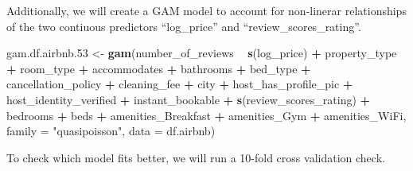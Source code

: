 \documentclass[
]{article}
\newenvironment{Shaded}{\begin{snugshade}}{\end{snugshade}}
\newcommand{\DataTypeTok}[1]{\textcolor[rgb]{0.13,0.29,0.53}{#1}}
\newcommand{\FloatTok}[1]{\textcolor[rgb]{0.00,0.00,0.81}{#1}}
\newcommand{\KeywordTok}[1]{\textcolor[rgb]{0.13,0.29,0.53}{\textbf{#1}}}
\newcommand{\NormalTok}[1]{#1}
\newcommand{\OperatorTok}[1]{\textcolor[rgb]{0.81,0.36,0.00}{\textbf{#1}}}
\newcommand{\StringTok}[1]{\textcolor[rgb]{0.31,0.60,0.02}{#1}}
\begin{document}
Additionally, we will create a GAM model to account for non-linerar
relationships of the two contiuous predictors ``log\_price'' and
``review\_scores\_rating''.

\begin{Shaded}
\begin{Highlighting}[]
\NormalTok{gam.df.airbnb}\FloatTok{.53}\NormalTok{ <-}\StringTok{ }\KeywordTok{gam}\NormalTok{(number_of_reviews }\OperatorTok{~}\StringTok{ }\KeywordTok{s}\NormalTok{(log_price) }\OperatorTok{+}\StringTok{ }\NormalTok{property_type }\OperatorTok{+}\StringTok{ }\NormalTok{room_type }\OperatorTok{+}
\StringTok{                          }\NormalTok{accommodates }\OperatorTok{+}\StringTok{ }\NormalTok{bathrooms }\OperatorTok{+}\StringTok{ }\NormalTok{bed_type }\OperatorTok{+}\StringTok{ }\NormalTok{cancellation_policy }\OperatorTok{+}
\StringTok{                          }\NormalTok{cleaning_fee }\OperatorTok{+}\StringTok{ }\NormalTok{city }\OperatorTok{+}\StringTok{ }\NormalTok{host_has_profile_pic }\OperatorTok{+}
\StringTok{                          }\NormalTok{host_identity_verified }\OperatorTok{+}\StringTok{ }\NormalTok{instant_bookable }\OperatorTok{+}
\StringTok{                          }\KeywordTok{s}\NormalTok{(review_scores_rating) }\OperatorTok{+}\StringTok{ }\NormalTok{bedrooms }\OperatorTok{+}\StringTok{ }\NormalTok{beds }\OperatorTok{+}\StringTok{ }
\StringTok{                          }\NormalTok{amenities_Breakfast }\OperatorTok{+}\StringTok{ }\NormalTok{amenities_Gym }\OperatorTok{+}\StringTok{ }\NormalTok{amenities_WiFi,}
                        \DataTypeTok{family =} \StringTok{"quasipoisson"}\NormalTok{,}
                        \DataTypeTok{data =}\NormalTok{ df.airbnb)}
\end{Highlighting}
\end{Shaded}

To check which model fits better, we will run a 10-fold cross validation
check.
\end{document}
